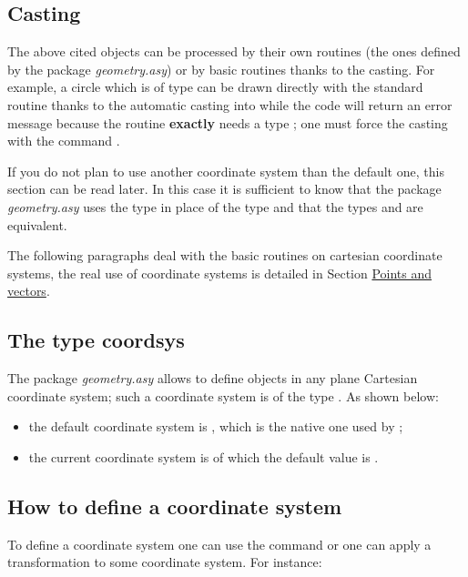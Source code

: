 \documentclass[pdftex]{article}
\newcommand{\geo}{the package \emph{geometry.asy}\xspace}
\newcommand{\Geo}{The package \emph{geometry.asy}\xspace}
\begin{document}
\subsection{Casting }
The above cited objects can be processed by their own routines (the
ones defined by \geo) or by basic \asymptote routines thanks to the casting.
For example, a circle which is of type  can be drawn
directly with the standard routine  thanks to the automatic
casting  into  while the code
 will return an error message because the
routine   {\bf exactly} needs  a type ; one must
force the casting with   the command .


If you do not plan to use another coordinate system than the default one, this
section can be read later. In this case it is sufficient to know that
\geo uses the type  in place of the type  and
that the types  and  are equivalent.

The following paragraphs deal with the basic routines on cartesian
coordinate systems, the real use of coordinate systems is detailed in Section \href{#section.point}{Points and vectors}.

\subsection{The type coordsys}
\Geo allows to define objects in any plane Cartesian coordinate system; such a
coordinate system is of the type . As shown below:
\begin{itemize}
\item  the default coordinate system is
  ,
  which is the native one used by  \asymptote;
\item the current coordinate system is   of which the
  default value is .
\end{itemize}

\subsection{How to define a coordinate system}
To define a coordinate system one can use the command
 or one can apply a transformation to some
coordinate system. For instance:
\end{document}
